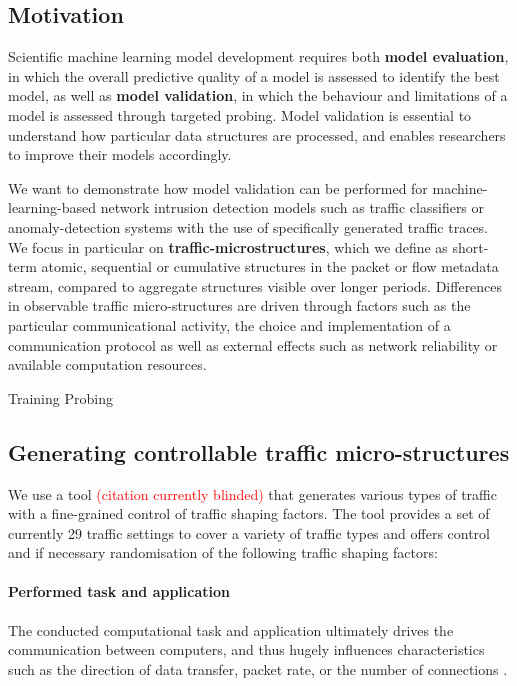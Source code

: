 \documentclass[conference]{IEEEtran}
\begin{document}
\subsection{Motivation}

Scientific machine learning model development requires both \textbf{model evaluation}, in which the overall predictive quality of a model is assessed to identify the best model, as well as \textbf{model validation}, in which the behaviour and limitations of a model is assessed through targeted probing. Model validation is essential to understand how particular data structures are processed, and enables researchers to improve their models accordingly.

We want to demonstrate how model validation can be performed for machine-learning-based network intrusion detection models such as traffic classifiers or anomaly-detection systems with the use of specifically generated traffic traces. We focus in particular on \textbf{traffic-microstructures}, which we define as  short-term atomic, sequential or cumulative structures in the packet or flow metadata stream, compared to aggregate structures visible over longer periods. Differences in observable traffic micro-structures are driven through factors such as the particular communicational activity, the choice and implementation of a communication protocol as well as external effects such as network reliability or available computation resources.




Training
Probing


\subsection{Generating controllable traffic micro-structures}

We use a tool \textcolor{red}{(citation currently blinded)} that generates various types of traffic with a fine-grained control of traffic shaping factors. 
The tool provides a set of currently 29 traffic settings to cover a variety of traffic types and offers control and if necessary randomisation of the following traffic shaping factors:

 
\paragraph{Performed task and application}
The conducted computational task and application ultimately drives the communication between computers, and thus hugely influences characteristics such as the direction of data transfer, packet rate, or the number of connections \cite{stober2013you}.
\end{document}
